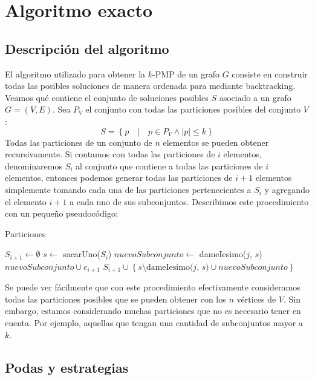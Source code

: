\section{Algoritmo exacto}

\subsection{Descripción del algoritmo}
El algoritmo utilizado para obtener la $k$-PMP de un grafo $G$ consiste en construir 
todas las posibles soluciones de manera ordenada para mediante backtracking.
Veamos qué contiene el conjunto de soluciones posibles $S$ asociado a un grafo $G = (V, E)$.
Sea $P_V$ el conjunto con todas las particiones posibles del conjunto $V$:
\begin{displaymath}
  S = \left\{p \quad | \quad p \in P_V \land \left\vert{p}\right\vert \leq k\right\}
\end{displaymath}
Todas las particiones de un conjunto de $n$ elementos se pueden obtener recursivamente. Si contamos
con todas las particiones de $i$ elementos, denominaremos $S_i$ al conjunto que contiene a todas las
particiones de $i$ elementos, entonces podemos generar todas las particiones de $i+1$ elementos simplemente 
tomando cada una de las particiones pertenecientes a $S_i$ y agregando el elemento $i+1$ a cada uno 
de sus subconjuntos. Describimos este procedimiento con un pequeño pseudocódigo:

\begin{algorithm}[H]
\begin{algorithmic}
\caption{Particiones}
  \STATE $S_{i+1}\gets \emptyset$
    \STATE $s\gets$ sacarUno($S_i$)
      \STATE $nuevoSubconjunto \gets $ dameIesimo($j$, $s$)
      \STATE $nuevoSubconjunto \cup e_{i+1}$
      \STATE $S_{i+1} \cup \left\{ s \setminus \text{dameIesimo(}j\text{, }s\text{)} \cup nuevoSubconjunto \right\}$
    \ENDFOR
  \ENDWHILE
\end{algorithmic}
\end{algorithm}

Se puede ver fácilmente que con este procedimiento efectivamente consideramos todas las particiones
posibles que se pueden obtener con los $n$ vértices de $V$. Sin embargo, estamos considerando muchas
particiones que no es necesario tener en cuenta. Por ejemplo, aquellas que tengan una cantidad de
subconjuntos mayor a $k$.

\subsection{Podas y estrategias}

